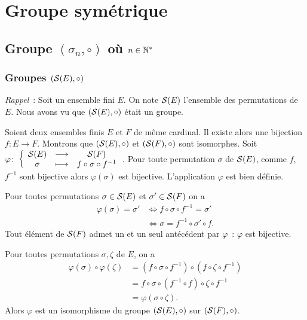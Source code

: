 \chapter{Groupe symétrique}
\label{chap:groupesymetrique}
\minitoc
\minilof
\minilot

\section{Groupe \((\sigma_n, \circ)\) où \(n \in \N^*\)}

\subsection{Groupes \((\S(E),\circ)\)}

\emph{Rappel}~: Soit un ensemble fini \(E\). On note \(\S(E)\) l'ensemble des permutations de \(E\). Nous avons vu que \((\S(E),\circ)\) était un groupe.

Soient deux ensembles finis \(E\) et \(F\) de même cardinal. Il existe alors une bijection \(f: E \rightarrow F\). Montrons que \((\S(E),\circ)\) et \((\S(F),\circ)\) sont isomorphes. Soit \(\fonction{\varphi}{\S(E)}{\S(F)}{\sigma}{f \circ \sigma \circ f^{-1}}\). Pour toute permutation \(\sigma\) de \(\S(E)\), comme \(f\), \(f^{-1}\) sont bijective alors \(\varphi(\sigma)\) est bijective. L'application \(\varphi\) est bien définie.

Pour toutes permutations \(\sigma \in \S(E)\) et \(\sigma' \in \S(F)\) on a
\begin{align}
  \varphi(\sigma) = \sigma' &\iff f \circ \sigma \circ f^{-1} = \sigma' \\
                            & \iff \sigma =f^{-1} \circ \sigma' \circ f.
\end{align}
Tout élément de \(\S(F)\) admet un et un seul antécédent par \(\varphi\)~: \(\varphi\) est bijective.

Pour toutes permutations \(\sigma, \zeta\) de \(E\), on a
\begin{align}
  \varphi(\sigma) \circ \varphi(\zeta) &= (f \circ \sigma \circ f^{-1}) \circ (f \circ \zeta \circ f^{-1}) \\
                                       & = f \circ \sigma \circ (f^{-1} \circ f) \circ \zeta \circ f^{-1} \\
                                       & = \varphi(\sigma \circ \zeta).
\end{align}
Alors \(\varphi\) est un isomorphisme du groupe \((\S(E),\circ)\) sur \((\S(F),\circ)\).

